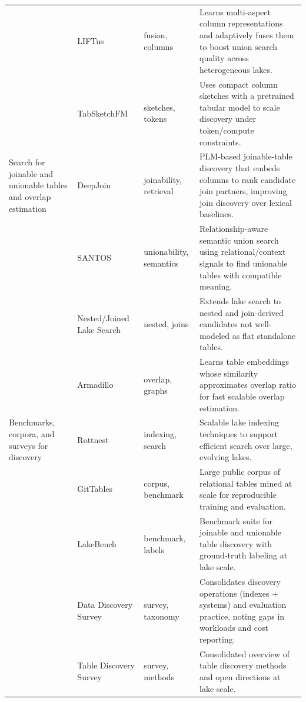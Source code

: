 \documentclass[sigconf]{acmart}
\begin{document}
\begin{table}[!htbp]
\begin{tabularx}{\textwidth}{@{}p{24mm}p{28mm}p{18mm}Y@{}}
~ &
LIFTus~\cite{11113165} &
fusion, columns &
Learns multi-aspect column representations and adaptively fuses them to boost union search quality across heterogeneous lakes. \\

~ &
TabSketchFM~\cite{11113110} &
sketches, tokens &
Uses compact column sketches with a pretrained tabular model to scale discovery under token/compute constraints. \\

\midrule

Search for joinable and unionable tables and overlap estimation &
DeepJoin~\cite{10.14778/3603581.3603587} &
joinability, retrieval &
PLM-based joinable-table discovery that embeds columns to rank candidate join partners, improving join discovery over lexical baselines. \\

~ &
SANTOS~\cite{10.1145/3588689} &
unionability, semantics &
Relationship-aware semantic union search using relational/context signals to find unionable tables with compatible meaning. \\

~ &
Nested/Joined Lake Search~\cite{10.14778/3681954.3682005} &
nested, joins &
Extends lake search to nested and join-derived candidates not well-modeled as flat standalone tables. \\

~ &
Armadillo~\cite{10.1145/3725365} &
overlap, graphs &
Learns table embeddings whose similarity approximates overlap ratio for fast scalable overlap estimation. \\

\midrule

Benchmarks, corpora, and surveys for discovery &
Rottnest~\cite{11113229} &
indexing, search &
Scalable lake indexing techniques to support efficient search over large, evolving lakes. \\

~ &
GitTables~\cite{10.1145/3588710} &
corpus, benchmark &
Large public corpus of relational tables mined at scale for reproducible training and evaluation. \\

~ &
LakeBench~\cite{10.14778/3659437.3659448} &
benchmark, labels &
Benchmark suite for joinable and unionable table discovery with ground-truth labeling at lake scale. \\

~ &
Data Discovery Survey~\cite{10.14778/3750601.3750694} &
survey, taxonomy &
Consolidates discovery operations (indexes + systems) and evaluation practice, noting gaps in workloads and cost reporting. \\

~ &
Table Discovery Survey~\cite{10.1145/3555041.3589409} &
survey, methods &
Consolidated overview of table discovery methods and open directions at lake scale. \\

\bottomrule
\end{tabularx}
\end{table}
\end{document}
